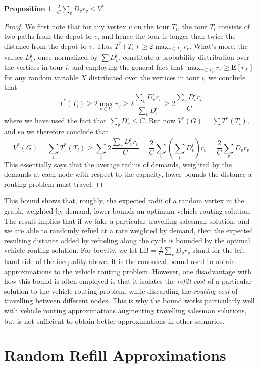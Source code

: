 \documentclass{article}
\theoremstyle{plain}
\theoremstyle{plain}
\newtheorem{proposition}[theorem]{Proposition}
\begin{document}
\begin{proposition}$\frac{2}{C} \sum_v D_v r_v \leq V^*$
\end{proposition}
\begin{proof}
    We first note that for any vertex $v$ on the tour $T_i$, the tour $T_i$ consists of two paths from the depot to $v$, and hence the tour is longer than twice the distance from the depot to $v$. Thus $T^*(T_i) \geq 2 \max_{v \in T_i} r_v$. What's more, the values $D^i_v$, once normalized by $\sum D^i_v$, constitute a probability distribution over the vertices in tour $i$, and employing the general fact that $\max_{v \in T_i} r_v \geq \mathbf{E}[r_X]$ for any random variable $X$ distributed over the vertices in tour $i$, we conclude that
    \[ T^*(T_i) \geq 2 \max_{v \in V_i} r_v \geq 2 \frac{\sum_v D^i_v r_v}{\sum_v D^i_v} \geq 2 \frac{\sum_v D^i_v r_v}{C} \]
    where we have used the fact that $\sum_v D^i_v \leq C$. But now $V^*(G) = \sum T^*(T_i)$, and so we therefore conclude that
    \[ V^*(G) = \sum_i T^*(T_i) \geq \sum_i 2 \frac{\sum_v D^i_v r_v}{C} = \frac{2}{C} \sum_v \left( \sum_i D^i_v \right) r_v = \frac{2}{C} \sum_v D_v r_v \]
    This essentially says that the average radius of demands, weighted by the demands at each node with respect to the capacity, lower bounds the distance a routing problem must travel.
\end{proof}

This bound shows that, roughly, the expected radii of a random vertex in the graph, weighted by demand, lower bounds an optimum vehicle routing solution. The result implies that if we take a particular travelling salesman solution, and we are able to randomly refuel at a rate weighted by demand, then the expected resulting distance added by refueling along the cycle is bounded by the optimal vehicle routing solution. For brevity, we let $\text{LB} = \frac{2}{C} \sum_v D_v r_v$ stand for the left hand side of the inequality above. It is the canonical bound used to obtain approximations to the vehicle routing problem. However, one disadvantage with how this bound is often employed is that it isolates the {\it refill cost} of a particular solution to the vehicle routing problem, while discarding the {\it routing cost} of travelling between different nodes. This is why the bound works particularly well with vehicle routing approximations augmenting travelling salesman solutions, but is not sufficient to obtain better approximations in other scenarios.

\section{Random Refill Approximations}
\end{document}
